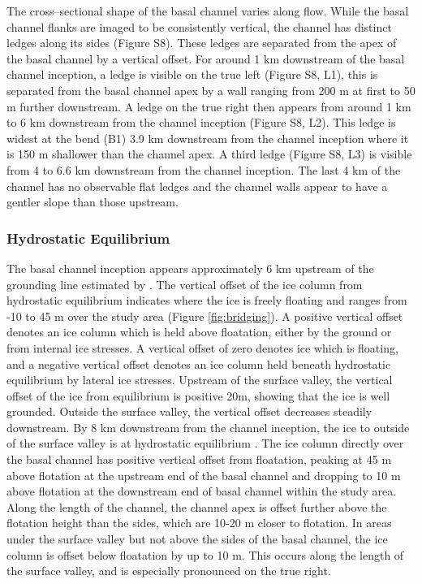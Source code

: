 The cross--sectional shape of the basal channel varies along flow. While the basal channel flanks are imaged to be consistently vertical, the channel has distinct ledges along its sides (Figure S8). These ledges are separated from the apex of the basal channel by a vertical offset. For around 1 km downstream of the basal channel inception, a ledge is visible on the true left (Figure S8, L1), this is separated from the basal channel apex by a wall ranging from 200 m at first to 50 m further downstream. A ledge on the true right then appears from around 1 km to 6 km downstream from the channel inception (Figure S8, L2). This ledge is widest at the bend (B1) 3.9 km downstream from the channel inception  where it is 150 m shallower than the channel apex. A third ledge (Figure S8, L3) is visible from 4 to 6.6 km downstream  from the channel inception.  The last 4 km of the channel has no observable flat ledges and the channel walls appear to have a gentler slope than those upstream.

\subsubsection{Hydrostatic Equilibrium} \label{sec:floating}

The basal channel inception appears approximately 6 km upstream of the grounding line estimated by \cite{depoorter2013amii}. 
The vertical offset of the ice column from hydrostatic equilibrium indicates where the ice is freely floating and ranges from -10 to 45 m over the study area (Figure \ref{fig:bridging}).
A positive vertical offset denotes an ice column which is held above floatation, either by the ground or from internal ice stresses. A vertical offset of zero denotes ice which is floating, and a negative vertical offset denotes an ice column held beneath hydrostatic equilibrium by lateral ice stresses. 
Upstream of the surface valley, the vertical offset of the ice from equilibrium is positive 20m, showing that the ice is well grounded. Outside the surface valley,  the vertical offset decreases steadily downstream. By 8 km downstream from the channel inception, the ice to outside of the surface valley is at hydrostatic equilibrium . The ice column directly over the basal channel has positive vertical offset from floatation, peaking at 45 m above flotation at the upstream end of the basal channel and dropping to 10 m above flotation at the downstream end of basal channel within the study area. Along the length of the channel, the channel apex is offset further above the flotation height than the sides, which are 10-20 m closer to flotation. In areas under the surface valley but not above the sides of the basal channel, the ice column is offset below floatation by up to 10 m. This occurs along the length of the surface valley, and is especially pronounced on the true right.

